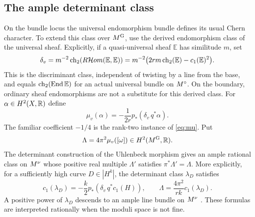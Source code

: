 \subsection{The ample determinant class}
On the bundle locus the universal endomorphism bundle defines its usual
Chern character. To extend this class over $M^{\mathrm G}$, use the derived
endomorphism class of the universal sheaf. Explicitly, if a
quasi-universal sheaf $\mathbb E$ has similitude $m$, set
\[
 \delta_v=m^{-2}\operatorname{ch}_2(R\mathcal Hom(\mathbb E,\mathbb E))
 =m^{-2}\big(2rm\operatorname{ch}_2(\mathbb E)-c_1(\mathbb E)^2\big).
\]
This is the discriminant class, independent of twisting by a line from the
base, and equals $\operatorname{ch}_2(\operatorname{End}\mathbb E)$ for an actual universal bundle
on $M^{\circ}$. On the boundary, ordinary sheaf endomorphisms are not a
substitute for this derived class.
For $\alpha\in H^2(X,\mathbb R)$ define
\begin{equation}\label{eq:mu}
 \mu_v(\alpha)=-\frac1{2r}p_*(\delta_v\,q^*\alpha).
\end{equation}
The familiar coefficient $-1/4$ is the rank-two instance of
\eqref{eq:mu}. Put
\begin{equation}\label{eq:lambda}
 \Lambda=4\pi^2\mu_v([\omega])\in H^2(M^{\mathrm G},\mathbb R).
\end{equation}
The determinant construction of the Uhlenbeck morphism gives an ample
rational class on $M^{\nu}$ whose positive real multiple $\Lambda'$ satisfies
$\pi^*\Lambda'=\Lambda$. More explicitly, for a sufficiently high curve
$D\in|H^k|$, the determinant class $\lambda_D$ satisfies
\begin{equation}\label{eq:determinant-class}
 c_1(\lambda_D)=-\frac{k}{2}p_*
 (\delta_v\,q^*c_1(H)),\qquad
 \Lambda=\frac{4\pi^2}{rk}c_1(\lambda_D).
\end{equation}
A positive power of $\lambda_D$ descends to an ample line bundle on
$M^{\nu}$ \cite[Section~8.2]{HL10}. These formulas are interpreted rationally
when the moduli space is not fine.

